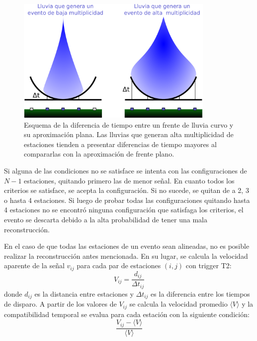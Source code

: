 	\begin{figure}[ht]
	\begin{center}
	\includegraphics[width=0.85\textwidth]{fig/seleccionAuger/plano_vs_curvo.pdf}
	\caption{Esquema de la diferencia de tiempo entre un frente de lluvia curvo y su aproximación plana. 
	Las lluvias que generan alta multiplicidad de estaciones tienden a presentar diferencias de tiempo mayores al compararlas con la aproximación de frente plano.}
	\label{fig:planeFrontAprox}
	\end{center}
	\end{figure}
	Si alguna de las condiciones no se satisface se intenta con las configuraciones de $N-1$ estaciones, quitando primero las de menor señal. 
	En cuanto todos los criterios se satisface, se acepta la configuración. Si no sucede, se quitan de a 2, 3 o hasta 4 estaciones.
	Si luego de probar todas las configuraciones quitando hasta 4 estaciones no se encontró ninguna configuración que satisfaga los criterios, el evento se descarta debido a la alta probabilidad de tener una mala reconstrucción.
	
	En el caso de que todas las estaciones de un evento sean alineadas, no es posible realizar la reconstrucción antes mencionada.
	En su lugar, se calcula la velocidad aparente de la señal $v_{ij}$ para cada par de estaciones $(i,j)$ con trigger T2:
	\begin{equation}
	 V_{ij}=\frac{d_{ij}}{\Delta t_{ij}}
	\end{equation}
	donde $d_{ij}$ es la distancia entre estaciones y $\Delta t_{ij}$ es la diferencia entre los tiempos de disparo.
	A partir de los valores de $V_{ij}$ se calcula la velocidad promedio $\langle V\rangle$ y la compatibilidad temporal se evalua para cada estación con la siguiente condición:
	\begin{equation}
	 \frac{V_{ij}-\langle V\rangle}{\langle V\rangle}
	\end{equation}
	
